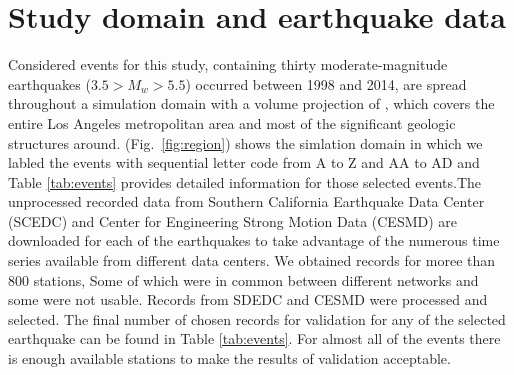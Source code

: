 
\section{Study domain and earthquake data}

Considered events for this study, containing thirty moderate-magnitude earthquakes ($3.5 > M_w > 5.5$) occurred between 1998 and 2014, are spread throughout a simulation domain with a volume projection of , which covers the entire Los Angeles metropolitan area and most of the significant geologic structures around. (Fig.~\ref{fig:region}) shows the simlation domain in which we labled the events with sequential letter code from A to Z and AA to AD and Table \ref{tab:events} provides detailed information for those selected events.The unprocessed recorded data from Southern California Earthquake Data Center (SCEDC) and Center for Engineering Strong Motion Data (CESMD) are downloaded for each of the earthquakes to take advantage of the numerous time series available from different data centers. We obtained records for moree than 800 stations, Some of which were in common between different networks and some were not usable. Records from SDEDC and CESMD were processed and selected. The final number of chosen records for validation for any of the selected earthquake can be found in Table \ref{tab:events}. For almost all of the events there is enough  available stations to make the results of validation acceptable. 




